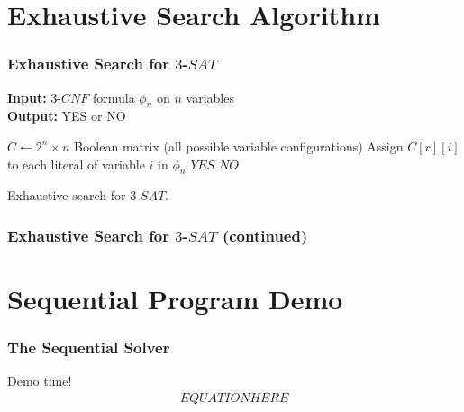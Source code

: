 \documentclass[handout]{beamer}
\begin{document}

\section{Exhaustive Search Algorithm}
\begin{frame}[fragile]
	\frametitle{Exhaustive Search for $3$-$SAT$}
	
\textbf{Input:} $3$-$CNF$ formula $\phi_n$ on $n$ variables \\
\textbf{Output:} YES or NO 

\medskip

\begin{algorithm}[H]
\begin{algorithmic}[1]
\STATE $C \gets 2^n \times n$ Boolean matrix (all possible variable configurations)
		\STATE Assign $C[r][i]$ to each literal of variable $i$ in $\phi_n$
	\ENDFOR
		\RETURN $YES$
	\ENDIF
\ENDFOR
\RETURN $NO$
\end{algorithmic}
\caption{Exhaustive search for $3$-$SAT$.}
\label{alg:seq}
\end{algorithm}
	
\end{frame}

\begin{frame}
	\frametitle{Exhaustive Search for $3$-$SAT$ (continued)}
\end{frame}

\section{Sequential Program Demo}
\begin{frame}
	\frametitle{The Sequential Solver}
	\begin{center}
		Demo time!
		\begin{align*}
			EQUATION HERE
		\end{align*}
	\end{center}
\end{frame}

%	
%	

\begin{comment}
\begin{figure}
\centering
\texttt{[image: images/sub\_layer.jpg]}
\end{figure}
\end{comment}
\end{document}
